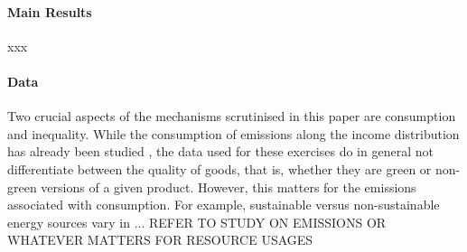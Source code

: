 


\paragraph{Main Results} xxx

\paragraph{Data}
Two crucial aspects of the mechanisms scrutinised in this paper are consumption and inequality. 
While the consumption of emissions along the income distribution has already been studied \citep[e.g.][]{Sager2019IncomeCurves}, the data used for these exercises do in general not differentiate between the quality of goods, that is, whether they are green or non-green versions of a given product. 
However, this matters for the emissions associated with consumption.  For example, sustainable versus non-sustainable energy sources vary in ... REFER TO STUDY ON EMISSIONS OR WHATEVER MATTERS FOR RESOURCE USAGES

